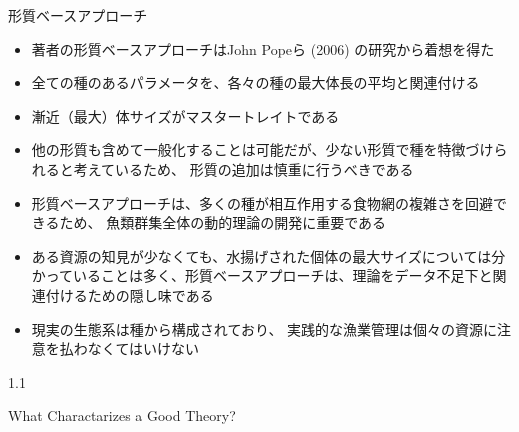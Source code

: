 \documentclass[
  ignorenonframetext,
]{beamer}
\providecommand{\tightlist}{%
  \setlength{\itemsep}{0pt}\setlength{\parskip}{0pt}}
\begin{document}
\begin{frame}{形質ベースアプローチ}
\protect\hypertarget{ux5f62ux8ceaux30d9ux30fcux30b9ux30a2ux30d7ux30edux30fcux30c1}{}

\begin{itemize}[<+->]
\tightlist
\item
  著者の形質ベースアプローチはJohn Popeら (2006) の研究から着想を得た\\
\item
  全ての種のあるパラメータを、各々の種の最大体長の平均と関連付ける 
\item
  漸近（最大）体サイズがマスタートレイトである 
\item
  他の形質も含めて一般化することは可能だが、少ない形質で種を特徴づけられると考えているため、
  形質の追加は慎重に行うべきである\\
\item
  形質ベースアプローチは、多くの種が相互作用する食物網の複雑さを回避できるため、
  魚類群集全体の動的理論の開発に重要である\\
\item
  ある資源の知見が少なくても、水揚げされた個体の最大サイズについては分かっていることは多く、形質ベースアプローチは、理論をデータ不足下と関連付けるための隠し味である\\
\item
  現実の生態系は種から構成されており、
  実践的な漁業管理は個々の資源に注意を払わなくてはいけない
\end{itemize}

\end{frame}

\begin{frame}

\begin{LARGE} 
\begin{center}
\begin{bf}
1.1   
  
What Charactarizes a Good Theory?
\end{bf}
\end{center}
\end{LARGE}

\end{frame}
\end{document}
